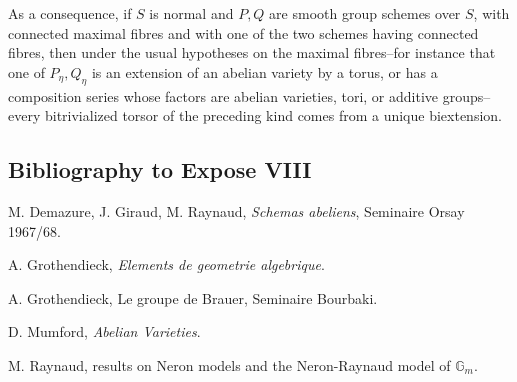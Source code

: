 \documentclass[11pt]{article}
\providecommand{\Gm}{\mathbb G_m}
\providecommand{\Gm}{\mathbb G_m}
\begin{document}
As a consequence, if \(S\) is normal and \(P,Q\) are smooth group schemes over \(S\), with connected maximal fibres and with one of the two schemes having connected fibres, then under the usual hypotheses on the maximal fibres--for instance that one of \(P_\eta,Q_\eta\) is an extension of an abelian variety by a torus, or has a composition series whose factors are abelian varieties, tori, or additive groups--every bitrivialized torsor of the preceding kind comes from a unique biextension.

\subsection*{Bibliography to Expose VIII}
\begin{enumerate}[label={[\arabic*]}]
\item M. Demazure, J. Giraud, M. Raynaud, \emph{Schemas abeliens}, Seminaire Orsay 1967/68.
\item A. Grothendieck, \emph{Elements de geometrie algebrique}.
\item A. Grothendieck, Le groupe de Brauer, Seminaire Bourbaki.
\item D. Mumford, \emph{Abelian Varieties}.
\item M. Raynaud, results on Neron models and the Neron-Raynaud model of \(\Gm\).
\end{enumerate}
\end{document}
